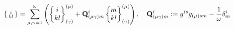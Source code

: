 \documentclass[preview]{standalone}
\begin{document}
\begin{align*}
\special{dvisvgm:raw <g id='unique000'>}\left\{\begin{smallmatrix}i\\kl\end{smallmatrix}\right\} = \sum_{\mu,\gamma=1}^\omega \left(\begin{Bmatrix}i\\kl\end{Bmatrix}_{(\gamma)}^{(\mu)} + \mathbf{Q}_{(\mu\gamma)m}^i \begin{Bmatrix}m\\kl\end{Bmatrix}_{(\gamma)}^{(\mu)}\right),\quad \mathbf{Q}_{(\mu\gamma)m}^i := g^{is}g_{(\mu)sm} - \frac{1}{\omega}\delta_m^i\special{dvisvgm:raw </g>}
\end{align*}
\end{document}
